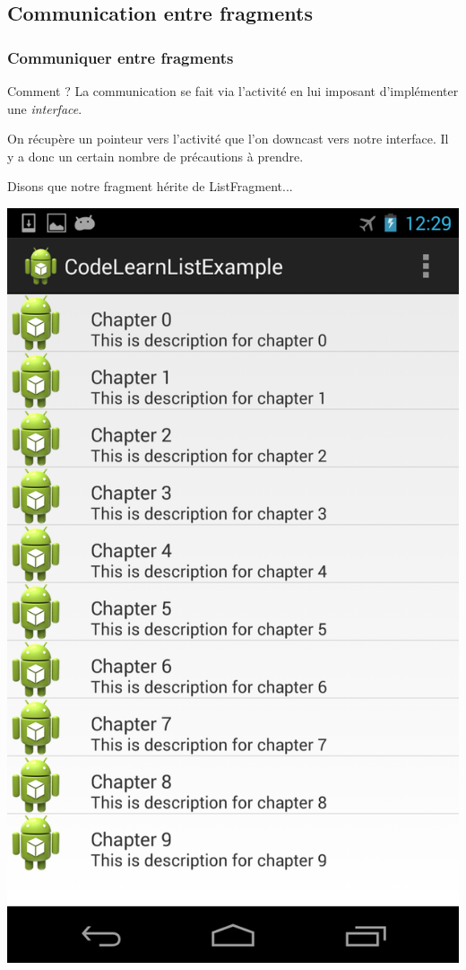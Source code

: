 \documentclass{beamer}
\begin{document}
\subsection{Communication entre fragments}

\begin{frame}
\frametitle{Communiquer entre fragments}
\begin{block}{Comment ?}
La communication se fait via l'activité en lui imposant d'implémenter une \emph{interface}.
\end{block}
\pause
\begin{block}{}
On récupère un pointeur vers l'activité que l'on downcast vers notre interface. Il y a donc un certain nombre de précautions à prendre.
\end{block}
\end{frame}

\begin{frame}
  \begin{block}{Disons que notre fragment hérite de ListFragment...}
    \begin{center}
      \includegraphics[scale=0.15]{listview.png}
    \end{center}
  \end{block}
\end{frame}
\end{document}
